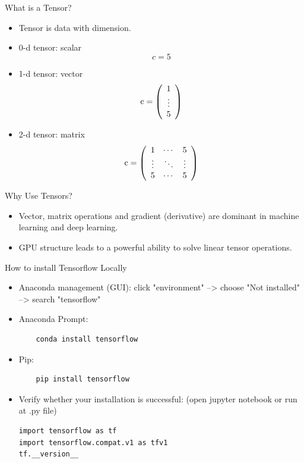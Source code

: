 \documentclass{beamer}
\begin{document}
\begin{frame}[fragile]{What is a Tensor?}
\begin{itemize}
	\item Tensor is data with dimension.
	\item 0-d tensor: scalar
	\begin{equation*}
	c = 5
	\end{equation*} 
	\item 1-d tensor: vector
	\begin{equation*}
	{\rm{c}} = \left( {\begin{array}{*{20}{c}}
1\\
 \vdots \\
5
\end{array}} \right)
	\end{equation*} 
	\item 2-d tensor: matrix
	\begin{equation*}
	{\rm{c}} = \left( {\begin{array}{*{20}{c}}
1& \cdots &5\\
 \vdots & \ddots & \vdots \\
5& \cdots &5
\end{array}} \right)
	\end{equation*}
\end{itemize}
\end{frame}


\begin{frame}[fragile]{Why Use Tensors?}
\begin{itemize}
	\item Vector, matrix operations and gradient (derivative) are dominant in machine learning and deep learning.
	\item GPU structure leads to a powerful ability to solve linear tensor operations.
\end{itemize}
\end{frame}


\begin{frame}[fragile]{How to install Tensorflow Locally}
\begin{itemize}
	\item Anaconda management (GUI): click "environment" --> choose "Not installed" --> search "tensorflow"
	\item Anaconda Prompt: 
	\begin{verbatim}
    conda install tensorflow
	\end{verbatim}
	\item Pip:
	\begin{verbatim}
    pip install tensorflow 
	\end{verbatim} 
	\item Verify whether your installation is successful: (open jupyter notebook or run at .py file)
	\begin{lstlisting}[style = Python]
import tensorflow as tf
import tensorflow.compat.v1 as tfv1
tf.__version__
\end{lstlisting}
\end{itemize}
\end{frame}
\end{document}
